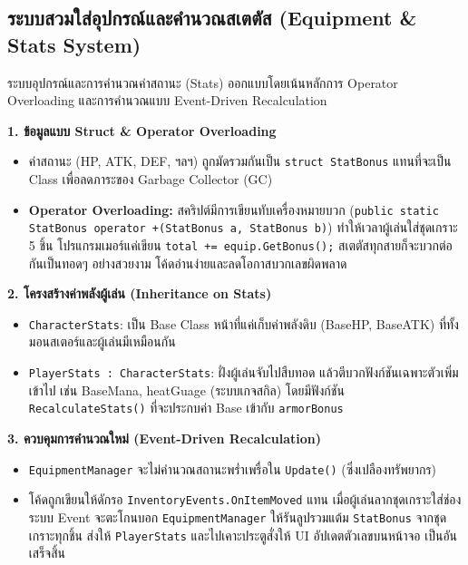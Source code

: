 \subsection{ระบบสวมใส่อุปกรณ์และคำนวณสเตตัส (Equipment \& Stats System)}

ระบบอุปกรณ์และการคำนวณค่าสถานะ (Stats) ออกแบบโดยเน้นหลักการ Operator Overloading และการคำนวณแบบ Event-Driven Recalculation

\textbf{1. ข้อมูลแบบ Struct \& Operator Overloading}

\begin{itemize}
\item ค่าสถานะ (HP, ATK, DEF, ฯลฯ) ถูกมัดรวมกันเป็น \texttt{struct StatBonus} แทนที่จะเป็น Class เพื่อลดภาระของ Garbage Collector (GC)
\item \textbf{Operator Overloading:} สคริปต์มีการเขียนทับเครื่องหมายบวก (\texttt{public static StatBonus operator +(StatBonus a, StatBonus b)}) ทำให้เวลาผู้เล่นใส่ชุดเกราะ 5 ชิ้น โปรแกรมเมอร์แค่เขียน \texttt{total += equip.GetBonus();} สเตตัสทุกสายก็จะบวกต่อกันเป็นทอดๆ อย่างสวยงาม โค้ดอ่านง่ายและลดโอกาสบวกเลขผิดพลาด
\end{itemize}

\textbf{2. โครงสร้างค่าพลังผู้เล่น (Inheritance on Stats)}

\begin{itemize}
\item \texttt{CharacterStats}: เป็น Base Class หน้าที่แค่เก็บค่าพลังดิบ (BaseHP, BaseATK) ที่ทั้งมอนสเตอร์และผู้เล่นมีเหมือนกัน
\item \texttt{PlayerStats : CharacterStats}: ฝั่งผู้เล่นจับไปสืบทอด แล้วตีบวกฟังก์ชันเฉพาะตัวเพิ่มเข้าไป เช่น BaseMana, heatGuage (ระบบเกจสกิล) โดยมีฟังก์ชัน \texttt{RecalculateStats()} ที่จะประกบค่า Base เข้ากับ \texttt{armorBonus}
\end{itemize}

\textbf{3. ควบคุมการคำนวณใหม่ (Event-Driven Recalculation)}

\begin{itemize}
\item \texttt{EquipmentManager} จะไม่คำนวณสถานะพร่ำเพรื่อใน \texttt{Update()} (ซึ่งเปลืองทรัพยากร)
\item โค้ดถูกเขียนให้ดักรอ \texttt{InventoryEvents.OnItemMoved} แทน เมื่อผู้เล่นลากชุดเกราะใส่ช่อง ระบบ Event จะตะโกนบอก \texttt{EquipmentManager} ให้รันลูปรวมแต้ม \texttt{StatBonus} จากชุดเกราะทุกชิ้น ส่งให้ \texttt{PlayerStats} และไปเคาะประตูสั่งให้ UI อัปเดตตัวเลขบนหน้าจอ เป็นอันเสร็จสิ้น
\end{itemize}

